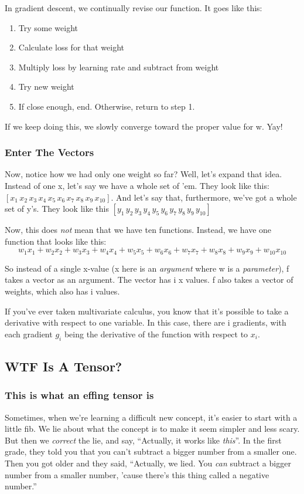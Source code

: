 \documentclass[11pt]{article}
\begin{document}
In gradient descent, we continually revise our function. It goes like this:
\begin{enumerate}
\item Try some weight
\item Calculate loss for that weight
\item Multiply loss by learning rate and subtract from weight
\item Try new weight
\item If close enough, end. Otherwise, return to step 1.
\end{enumerate}

If we keep doing this, we slowly converge toward the proper value for w. Yay!
\subsubsection{Enter The Vectors}
\label{sec:orgd785714}
Now, notice how we had only one weight so far? Well, let's expand that idea. Instead of one x, let's say we have a whole set of 'em. They look like this: \([x_1\,x_2\,x_3\,x_4\,x_5\,x_6\,x_7\,x_8\,x_9\,x_{10}]\). And let's say that, furthermore, we've got a whole set of y's. They look like this \([y_1\,y_2\,y_3\,y_4\,y_5\,y_6\,y_7\,y_8\,y_9\,y_{10}]\)

Now, this does \emph{not} mean that we have ten functions. Instead, we have one function that looks like this:
$$
w_{1}x_{1}+w_{2}x_{2}+w_{3}x_{3}+w_{4}x_{4}+w_{5}x_{5}+w_{6}x_{6}+w_{7}x_{7}+w_{8}x_{8}+w_{9}x_{9}+w_{10}x_{10}
$$

So instead of a single x-value (x here is an \emph{argument} where w is a \emph{parameter}), f takes a vector as an argument. The vector has i x values. f also takes a vector of weights, which also has i values.

If you've ever taken multivariate calculus, you know that it's possible to take a derivative with respect to one variable. In this case, there are i gradients, with each gradient \(g_i\) being the derivative of the function with respect to \(x_i\).
\subsection{WTF Is A Tensor?}
\label{sec:org388bcca}
\subsubsection{This is what an effing tensor is}
\label{sec:org95de5df}
Sometimes, when we're learning a difficult new concept, it's easier to start with a little fib. We lie about what the concept is to make it seem simpler and less scary. But then we \emph{correct} the lie, and say, ``Actually, it works like \emph{this}''. In the first grade, they told you that you can't subtract a bigger number from a smaller one. Then you got older and they said, ``Actually, we lied. You \emph{can} subtract a bigger number from a smaller number, 'cause there's this thing called a negative number.''
\end{document}
